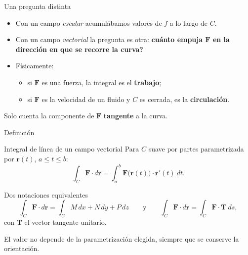 \documentclass[11pt,aspectratio=169]{beamer}
\begin{document}

\begin{frame}{Una pregunta distinta}
  \begin{itemize}
    \item Con un campo \emph{escalar} acumulábamos valores de $f$ a lo largo de $C$.
    \pause
    \item Con un campo \emph{vectorial} la pregunta es otra: \textbf{\textquestiondown{}cuánto empuja $\mathbf F$ en la dirección en que se recorre la curva?}
    \pause
    \item Físicamente:
    \begin{itemize}
      \item si $\mathbf F$ es una fuerza, la integral es el \textbf{trabajo};
      \item si $\mathbf F$ es la velocidad de un fluido y $C$ es cerrada, es la \textbf{circulación}.
    \end{itemize}
  \end{itemize}
  \vspace{10pt}
  \pause
  \begin{center}
  \normalsize\color{tealx}
  Solo cuenta la componente de $\mathbf F$ \textbf{tangente} a la curva.
  \end{center}
\end{frame}

\begin{frame}{Definición}
  \begin{block}{Integral de línea de un campo vectorial}
    Para $C$ suave por partes parametrizada por $\mathbf r(t)$, $a\le t\le b$:
    \[
      \int_C \mathbf F\cdot d\mathbf r
      = \int_a^b \mathbf F\bigl(\mathbf r(t)\bigr)\cdot\mathbf r'(t)\ dt.
    \]
  \end{block}
  \pause
  \begin{block}{Dos notaciones equivalentes}
    \[
      \int_C \mathbf F\cdot d\mathbf r = \int_C M\,dx+N\,dy+P\,dz
      \qquad\text{y}\qquad
      \int_C \mathbf F\cdot d\mathbf r = \int_C \mathbf F\cdot\mathbf T\ ds,
    \]
    con $\mathbf T$ el vector tangente unitario.
  \end{block}
  \pause
  \begin{center}\small\color{gray60}
  El valor no depende de la parametrización elegida, siempre que se conserve la orientación.
  \end{center}
\end{frame}
\end{document}
